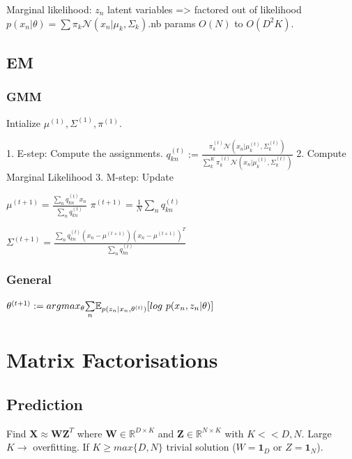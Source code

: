 Marginal likelihood: $z_n$ latent variables => factored out of likelihood \newline $p(x_n|\theta) = \sum \pi_k \mathcal{N}(x_n|\mu_k, \Sigma_k)$.\newline nb params $O(N)$ to $O(D^2K)$.

\subsection{EM}
\subsubsection{GMM}
Intialize $\mu^{(1)}, \Sigma^{(1)}, \pi^{(1)}$.

1. E-step: Compute the assignments. $q_{kn}^{(t)} := \frac{\pi_k^{(t)} \mathcal{N}(x_n|\mu_k^{(t)}, \Sigma_k^{(t)})}{ \sum_k^K\pi_k^{(t)} \mathcal{N}(x_n|\mu_k^{(t)}, \Sigma_k^{(t)}) }$
2. Compute Marginal Likelihood
3. M-step: Update

$\mu^{(t+1)} = \frac{\underset{n}{\sum} q_{kn}^{(t)} x_n}{\underset{n}{\sum} q_{kn}^{(t)}}$ $\pi^{(t+1)} = \frac{1}{N} \underset{n}{\sum} q_{kn}^{(t)}$

$\Sigma^{(t+1)} = \frac{\underset{n}{\sum} q_{kn}^{(t)}(x_n - \mu^{(t+1)})(x_n - \mu^{(t+1)})^T}{\underset{n}{\sum} q_{kn}^{(t)}}$
\newline

\subsubsection{General}
$\theta^{(t+1)} := argmax_{\theta} \underset{n}{\sum} \mathbb{E}_{p(z_n|x_n,\theta^{(t)})}\newline[log\,\, p(x_n,z_n|\theta)]$\newline

\section{Matrix Factorisations}
\subsection{Prediction}
Find $\mathbf{X} \approx \mathbf{W}\mathbf{Z}^T$ where $\mathbf{W} \in \mathbb{R}^{D\times K}$ and $\mathbf{Z} \in \mathbb{R}^{N\times K}$ with $K << D,N$. Large $K\rightarrow$ overfitting. If $K \ge max\{D,N\}$ trivial solution ($W=\mathbf{1}_D$ or $Z=\mathbf{1}_N$).

